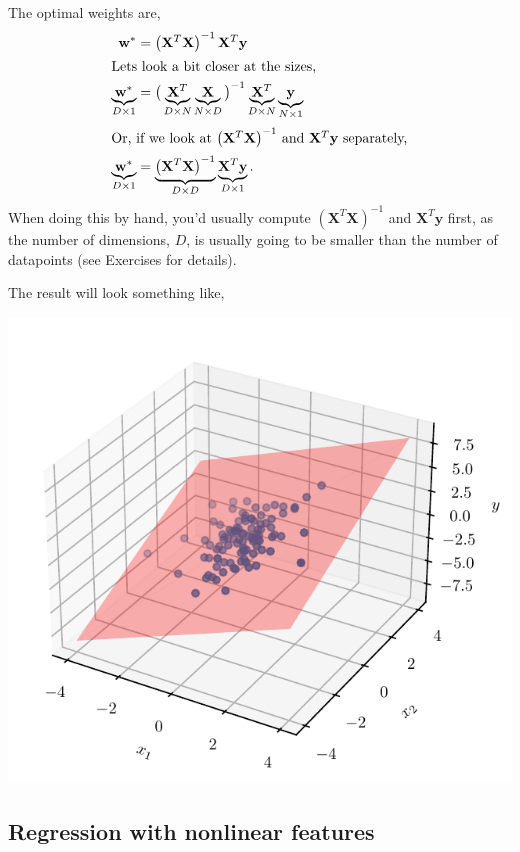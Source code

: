 \documentclass{article}
\newcommand{\bracket}[3]{\left#1 #3 \right#2}
\renewcommand{\b}{\bracket{(}{)}}
\newcommand{\y}{\mathbf{y}}
\newcommand{\X}{\mathbf{X}}
\newcommand{\w}{\mathbf{w}}
\newcommand{\wo}{\w^*}
\begin{document}
The optimal weights are,
\begin{align}
  \label{eq:wo}
  \wo &= \b{\X^T \X}^{-1} \X^T \y\\
  \intertext{Lets look a bit closer at the sizes,}
  \underbrace{\wo}_{D \times 1} &= \big( \underbrace{\X^T}_{D\times N} \underbrace{\X}_{N \times D}\big)^{-1} \underbrace{\X^T}_{D \times N} \underbrace{\y}_{N \times 1}\\
  \intertext{Or, if we look at $\b{\X^T \X}^{-1}$ and $\X^T \y$ separately,}
  \underbrace{\wo}_{D \times 1} &= \underbrace{\b{\X^T \X}^{-1}}_{D \times D} \underbrace{\X^T \y}_{D \times 1}.
\end{align}
When doing this by hand, you'd usually compute $\b{\X^T \X}^{-1}$ and $\X^T \y$ first, as the number of dimensions, $D$, is usually going to be smaller than the number of datapoints (see Exercises for details).

The result will look something like,
\begin{center}
  \includegraphics{multivariate.pdf}
\end{center}


\subsection{Regression with nonlinear features}
\end{document}
